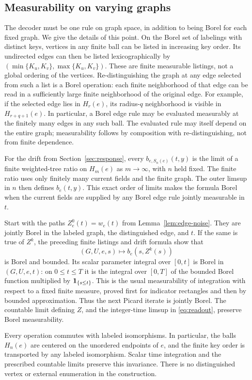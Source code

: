 \subsection{Measurability on varying graphs}

The decoder must be one rule on graph space, in addition to being Borel for
each fixed graph. We give the details of this point. On the Borel set of
labelings with distinct keys, vertices in any finite ball can be listed in
increasing key order. Its undirected edges can then be listed lexicographically by
$(\min\{K_u,K_v\},\max\{K_u,K_v\})$. These are finite measurable listings, not a global ordering
of the vertices. Re-distinguishing the graph at any edge selected from such
a list is a Borel operation: each finite neighborhood of that edge can be
read in a sufficiently large finite neighborhood of the original edge.
For example, if the selected edge lies in $H_r(e)$, its radius-$q$
neighborhood is visible in $H_{r+q+1}(e)$. In particular, a Borel edge rule
may be evaluated measurably at the finitely many edges in any such ball.
The evaluated rule may itself depend on the entire graph; measurability
follows by composition with re-distinguishing, not from finite dependence.

For the drift from Section~\ref{sec:response}, every
$b_{e,S_n(e)}(t,y)$ is the limit of a finite weighted-tree ratio on $H_m(e)$
as $m\to\infty$, with $n$ held fixed. The finite ratio uses only finitely
many current fields and the finite graph. The outer limsup in $n$ then
defines $b_e(t,y)$. This exact order of limits makes the formula Borel when
the current fields are supplied by any Borel edge rule jointly measurable
in $t$.

Start with the paths $Z_e^0(t)=w_e(t)$ from Lemma~\ref{lem:edge-noise}.
They are jointly Borel in the labeled graph, the distinguished edge, and
$t$. If the same is true of $Z^k$, the preceding finite listings and drift
formula show that
\[
 (G,U,e,s)\longmapsto b_e(s,Z^k(s))
\]
is Borel and bounded. Its scalar parameter integral over $[0,t]$ is Borel
in $(G,U,e,t)$: on $0\le t\le T$ it is the integral over $[0,T]$ of the
bounded Borel function multiplied by $\mathbf 1_{\{s\le t\}}$. This is the usual
measurability of integration with respect to a fixed finite measure, proved
first for indicator rectangles and then by bounded approximation. Thus
the next Picard iterate is jointly Borel. The countable limit defining
$Z$, and the integer-time limsup in \eqref{eq:readout}, preserve Borel
measurability.

Every operation commutes with labeled isomorphisms. In particular, the balls
$H_n(e)$ are centered on the unordered endpoints of $e$, and the finite
key order is transported by any labeled isomorphism. Scalar time integration
and the prescribed countable limits preserve this invariance. There is no
distinguished vertex or external enumeration in the construction.

